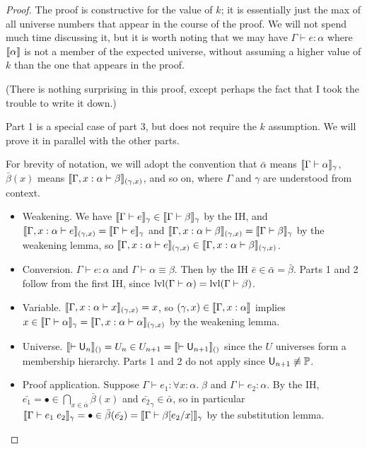 \begin{proof}
The proof is constructive for the value of $k$; it is essentially just the max of all universe numbers that appear in the course of the proof. We will not spend much time discussing it, but it is worth noting that we may have $\Gamma\vdash e:\alpha$ where $\llbracket \alpha\rrbracket$ is not a member of the expected universe, without assuming a higher value of $k$ than the one that appears in the proof.

(There is nothing surprising in this proof, except perhaps the fact that I took the trouble to write it down.)

Part 1 is a special case of part 3, but does not require the $k$ assumption. We will prove it in parallel with the other parts.

For brevity of notation, we will adopt the convention that $\bar\alpha$ means $\scott{\Gamma\vdash\alpha}_\gamma$, $\bar\beta(x)$ means $\scott{\Gamma,x:\alpha\vdash\beta}_{(\gamma,x)}$, and so on, where $\Gamma$ and $\gamma$ are understood from context.
\begin{itemize}
\item Weakening. We have $\scott{\Gamma\vdash e}_\gamma\in\scott{\Gamma\vdash\beta}_\gamma$ by the IH, and $\scott{\Gamma,x:\alpha\vdash e}_{(\gamma,x)}=\scott{\Gamma\vdash e}_\gamma$ and $\scott{\Gamma,x:\alpha\vdash\beta}_{(\gamma,x)}=\scott{\Gamma\vdash\beta}_\gamma$ by the weakening lemma, so $\scott{\Gamma,x:\alpha\vdash e}_{(\gamma,x)}\in \scott{\Gamma,x:\alpha\vdash\beta}_{(\gamma,x)}$.
\item Conversion. $\Gamma\vdash e:\alpha$ and $\Gamma\vdash\alpha\equiv\beta$. Then by the IH $\bar e\in\bar \alpha=\bar\beta$. Parts 1 and 2 follow from the first IH, since $\lvl(\Gamma\vdash\alpha)=\lvl(\Gamma\vdash\beta)$.
\item Variable. $\scott{\Gamma,x:\alpha\vdash x}_{(\gamma,x)}=x$, so $(\gamma,x)\in\scott{\Gamma,x:\alpha}$ implies $x\in\scott{\Gamma\vdash\alpha}_\gamma=\scott{\Gamma,x:\alpha\vdash\alpha}_{(\gamma,x)}$ by the weakening lemma.
\item Universe. $\llbracket \vdash\mathsf{U}_n\rrbracket_{()}=U_n\in U_{n+1}=\llbracket \vdash\mathsf{U}_{n+1}\rrbracket_{()}$ since the $U$ universes form a membership hierarchy. Parts 1 and 2 do not apply since $\mathsf{U}_{n+1}\not\equiv\mathbb{P}$.
\item Proof application. Suppose $\Gamma\vdash e_1:\forall x:\alpha.\;\beta$ and $\Gamma\vdash e_2:\alpha$. By the IH, $\bar{e_1}=\bullet\in\bigcap_{x\in \bar\alpha}\bar\beta(x)$ and $\bar{e_2}_\gamma\in\bar\alpha$, so in particular $\scott{\Gamma\vdash e_1\;e_2}_\gamma=\bullet\in\bar\beta(\bar{e_2})=\scott{\Gamma\vdash\beta[e_2/x]}_\gamma$ by the substitution lemma.

\end{itemize}
\end{proof}

